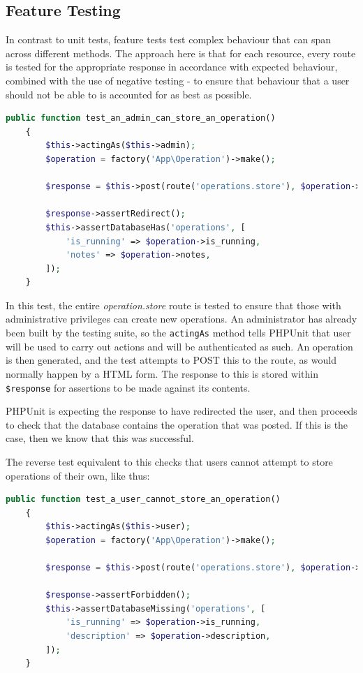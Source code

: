 \subsection{Feature Testing}
In contrast to unit tests, feature tests test complex behaviour that can span across different methods. The approach here is that for each resource, every route is tested for the appropriate response in accordance with expected behaviour, combined with the use of negative testing - to ensure that behaviour that a user should not be able to is accounted for as best as possible. \cite{Fornal1}

\begin{lstlisting}[language=PHP, breaklines]
    public function test_an_admin_can_store_an_operation()
    {
        $this->actingAs($this->admin);
        $operation = factory('App\Operation')->make();

        $response = $this->post(route('operations.store'), $operation->toArray());

        $response->assertRedirect();
        $this->assertDatabaseHas('operations', [
            'is_running' => $operation->is_running,
            'notes' => $operation->notes,
        ]);
    }
\end{lstlisting}

In this test, the entire \textit{operation.store} route is tested to ensure that those with administrative privileges can create new operations. An administrator has already been built by the testing suite, so the \texttt{actingAs} method tells PHPUnit that user will be used to carry out actions and will be authenticated as such. An operation is then generated, and the test attempts to POST this to the route, as would normally happen by a HTML form. The response to this is stored within \texttt{\$response} for assertions to be made against its contents.

PHPUnit is expecting the response to have redirected the user, and then proceeds to check that the database contains the operation that was posted. If this is the case, then we know that this was successful.

The reverse test equivalent to this checks that users cannot attempt to store operations of their own, like thus:

\begin{lstlisting}[language=PHP, breaklines]
    public function test_a_user_cannot_store_an_operation()
    {
        $this->actingAs($this->user);
        $operation = factory('App\Operation')->make();

        $response = $this->post(route('operations.store'), $operation->toArray());

        $response->assertForbidden();
        $this->assertDatabaseMissing('operations', [
            'is_running' => $operation->is_running,
            'description' => $operation->description,
        ]);
    }
\end{lstlisting}

